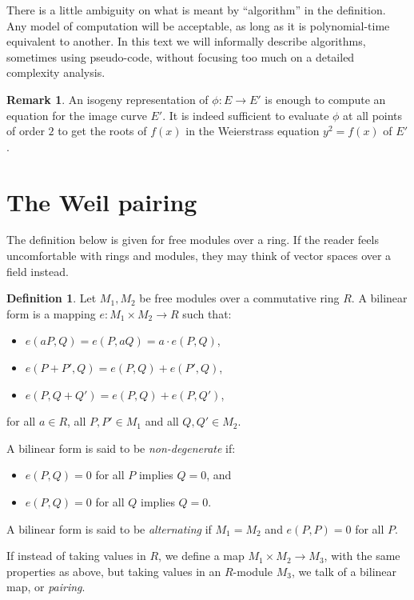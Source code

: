 \documentclass[10pt]{article}
\theoremstyle{plain}
\theoremstyle{definition}
\newtheorem{definition}[theorem]{Definition}
\newtheorem{remark}[theorem]{Remark}
\begin{document}
There is a little ambiguity on what is meant by ``algorithm'' in the
definition. %
Any model of computation will be acceptable, as long as it is
polynomial-time equivalent to another. %
In this text we will informally describe algorithms, sometimes using
pseudo-code, without focusing too much on a detailed complexity
analysis.

\begin{remark}
  An isogeny representation of $ϕ:E→E'$ is enough to compute an
  equation for the image curve $E'$. %
  It is indeed sufficient to evaluate $ϕ$ at all points of order $2$
  to get the roots of $f(x)$ in the Weierstrass equation $y^2 = f(x)$
  of $E'$.
\end{remark}


\section{The Weil pairing}
\label{sec:weil-pairing}

The definition below is given for free modules over a ring. %
If the reader feels uncomfortable with rings and modules, they may
think of vector spaces over a field instead.

\begin{definition}
  Let $M_1, M_2$ be free modules over a commutative ring $R$. %
  A bilinear form is a mapping $e:M_1\times M_2\to R$ such that:
  \begin{itemize}
  \item $e(aP,Q) = e(P,aQ) = a\cdot e(P,Q)$,
  \item $e(P+P', Q) = e(P,Q) + e(P',Q)$,
  \item $e(P, Q+Q') = e(P,Q) + e(P,Q')$,
  \end{itemize}
  for all $a\in R$, all $P,P'\in M_1$ and all $Q,Q'\in M_2$.

  A bilinear form is said to be \emph{non-degenerate} if:
  \begin{itemize}
  \item $e(P,Q)=0$ for all $P$ implies $Q=0$, and
  \item $e(P,Q)=0$ for all $Q$ implies $Q=0$.
  \end{itemize}

  A bilinear form is said to be \emph{alternating} if $M_1=M_2$ and
  $e(P,P)=0$ for all $P$.
\end{definition}

If instead of taking values in $R$, we define a map
$M_1\times M_2\to M_3$, with the same properties as above, but taking
values in an $R$-module $M_3$, we talk of a bilinear map, or
\emph{pairing}. %
\end{document}
